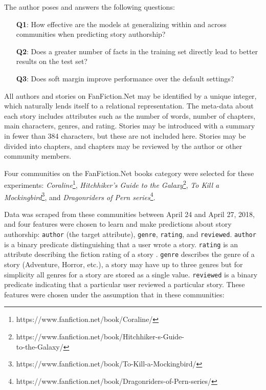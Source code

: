 \documentclass[letterpaper]{article}
\begin{document}
The author poses and answers the following questions:

\begin{enumerate}
    \item[\textbf{Q1}:] How effective are the models at generalizing within and across communities when predicting story authorship?
    \item[\textbf{Q2}:] Does a greater number of facts in the training set directly lead to better results on the test set?
    \item[\textbf{Q3}:] Does soft margin improve performance over the default settings?
\end{enumerate}

All authors and stories on FanFiction.Net may be identified by a unique integer, which naturally lends itself to a relational representation. The meta-data about each story includes attributes such as the number of words, number of chapters, main characters, genres, and rating. Stories may be introduced with a summary in fewer than 384 characters, but these are not included here. Stories may be divided into chapters, and chapters may be reviewed by the author or other community members.

Four communities on the FanFiction.Net books category were selected for these experiments: \textit{Coraline}\footnote{https://www.fanfiction.net/book/Coraline/}, \textit{Hitchhiker's Guide to the Galaxy}\footnote{https://www.fanfiction.net/book/Hitchhiker-s-Guide-\\to-the-Galaxy/}, \textit{To Kill a Mockingbird}\footnote{https://www.fanfiction.net/book/To-Kill-a-Mockingbird/}, and \textit{Dragonriders of Pern series}\footnote{https://www.fanfiction.net/book/Dragonriders-of-Pern-series/}.

Data was scraped from these communities between April 24 and April 27, 2018, and four features were chosen to learn and make predictions about story authorship: \texttt{author} (the target attribute), \texttt{genre}, \texttt{rating}, and \texttt{reviewed}. \texttt{author} is a binary predicate distinguishing that a user wrote a story. \texttt{rating} is an attribute describing the fiction rating of a story \cite{fictionratings}. \texttt{genre} describes the genre of a story (Adventure, Horror, etc.), a story may have up to three genres but for simplicity all genres for a story are stored as a single value. \texttt{reviewed} is a binary predicate indicating that a particular user reviewed a particular story.  These features were chosen under the assumption that in these communities:
\end{document}
